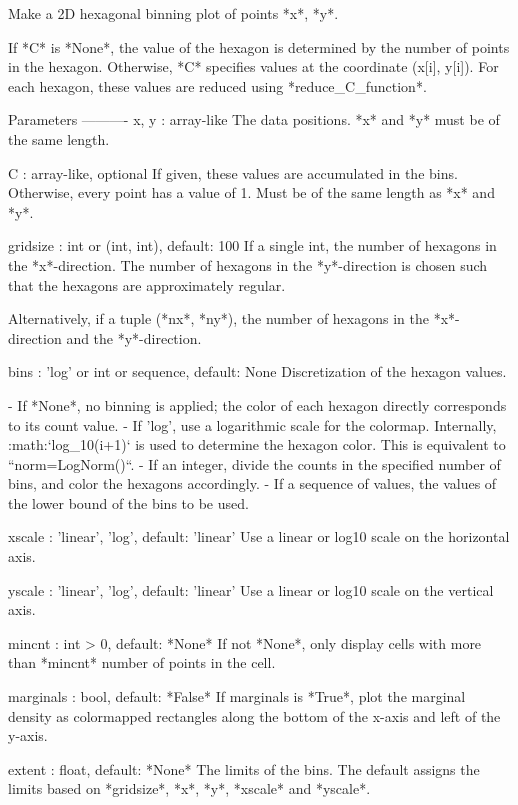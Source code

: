 \begin{DoxyVerb}Make a 2D hexagonal binning plot of points *x*, *y*.

If *C* is *None*, the value of the hexagon is determined by the number
of points in the hexagon. Otherwise, *C* specifies values at the
coordinate (x[i], y[i]). For each hexagon, these values are reduced
using *reduce_C_function*.

Parameters
----------
x, y : array-like
    The data positions. *x* and *y* must be of the same length.

C : array-like, optional
    If given, these values are accumulated in the bins. Otherwise,
    every point has a value of 1. Must be of the same length as *x*
    and *y*.

gridsize : int or (int, int), default: 100
    If a single int, the number of hexagons in the *x*-direction.
    The number of hexagons in the *y*-direction is chosen such that
    the hexagons are approximately regular.

    Alternatively, if a tuple (*nx*, *ny*), the number of hexagons
    in the *x*-direction and the *y*-direction.

bins : 'log' or int or sequence, default: None
    Discretization of the hexagon values.

    - If *None*, no binning is applied; the color of each hexagon
      directly corresponds to its count value.
    - If 'log', use a logarithmic scale for the colormap.
      Internally, :math:`log_{10}(i+1)` is used to determine the
      hexagon color. This is equivalent to ``norm=LogNorm()``.
    - If an integer, divide the counts in the specified number
      of bins, and color the hexagons accordingly.
    - If a sequence of values, the values of the lower bound of
      the bins to be used.

xscale : {'linear', 'log'}, default: 'linear'
    Use a linear or log10 scale on the horizontal axis.

yscale : {'linear', 'log'}, default: 'linear'
    Use a linear or log10 scale on the vertical axis.

mincnt : int > 0, default: *None*
    If not *None*, only display cells with more than *mincnt*
    number of points in the cell.

marginals : bool, default: *False*
    If marginals is *True*, plot the marginal density as
    colormapped rectangles along the bottom of the x-axis and
    left of the y-axis.

extent : float, default: *None*
    The limits of the bins. The default assigns the limits
    based on *gridsize*, *x*, *y*, *xscale* and *yscale*.


\end{DoxyVerb}
